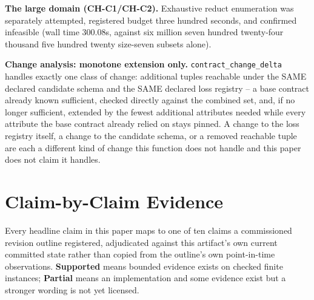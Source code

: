 \documentclass[11pt,a4paper]{article}
\theoremstyle{definition}
\begin{document}
\noindent\textbf{The large domain (CH-C1/CH-C2).} Exhaustive reduct enumeration was separately attempted, registered budget three hundred seconds, and confirmed infeasible (wall time 300.08s, against six million seven hundred twenty-four thousand five hundred twenty size-seven subsets alone).

\noindent\textbf{Change analysis: monotone extension only.} \texttt{contract\_change\_delta} handles exactly one class of change: additional tuples reachable under the SAME declared candidate schema and the SAME declared loss registry -- a base contract already known sufficient, checked directly against the combined set, and, if no longer sufficient, extended by the fewest additional attributes needed while every attribute the base contract already relied on stays pinned. A change to the loss registry itself, a change to the candidate schema, or a removed reachable tuple are each a different kind of change this function does not handle and this paper does not claim it handles.

\section{Claim-by-Claim Evidence}
\label{sec:claims}

Every headline claim in this paper maps to one of ten claims a commissioned revision outline registered, adjudicated against this artifact's own current committed state rather than copied from the outline's own point-in-time observations. \textbf{Supported} means bounded evidence exists on checked finite instances; \textbf{Partial} means an implementation and some evidence exist but a stronger wording is not yet licensed.
\end{document}
